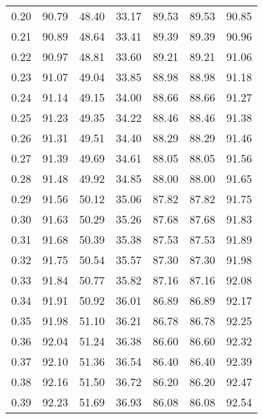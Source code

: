 \begin{tabular}{|c|c|c|c|c|c|c|}
      0.20 &     90.79 &     48.40 &      33.17 &   89.53 &      89.53 &         90.85 \\
      0.21 &     90.89 &     48.64 &      33.41 &   89.39 &      89.39 &         90.96 \\
      0.22 &     90.97 &     48.81 &      33.60 &   89.21 &      89.21 &         91.06 \\
      0.23 &     91.07 &     49.04 &      33.85 &   88.98 &      88.98 &         91.18 \\
      0.24 &     91.14 &     49.15 &      34.00 &   88.66 &      88.66 &         91.27 \\
      0.25 &     91.23 &     49.35 &      34.22 &   88.46 &      88.46 &         91.38 \\
      0.26 &     91.31 &     49.51 &      34.40 &   88.29 &      88.29 &         91.46 \\
      0.27 &     91.39 &     49.69 &      34.61 &   88.05 &      88.05 &         91.56 \\
      0.28 &     91.48 &     49.92 &      34.85 &   88.00 &      88.00 &         91.65 \\
      0.29 &     91.56 &     50.12 &      35.06 &   87.82 &      87.82 &         91.75 \\
      0.30 &     91.63 &     50.29 &      35.26 &   87.68 &      87.68 &         91.83 \\
      0.31 &     91.68 &     50.39 &      35.38 &   87.53 &      87.53 &         91.89 \\
      0.32 &     91.75 &     50.54 &      35.57 &   87.30 &      87.30 &         91.98 \\
      0.33 &     91.84 &     50.77 &      35.82 &   87.16 &      87.16 &         92.08 \\
      0.34 &     91.91 &     50.92 &      36.01 &   86.89 &      86.89 &         92.17 \\
      0.35 &     91.98 &     51.10 &      36.21 &   86.78 &      86.78 &         92.25 \\
      0.36 &     92.04 &     51.24 &      36.38 &   86.60 &      86.60 &         92.32 \\
      0.37 &     92.10 &     51.36 &      36.54 &   86.40 &      86.40 &         92.39 \\
      0.38 &     92.16 &     51.50 &      36.72 &   86.20 &      86.20 &         92.47 \\
      0.39 &     92.23 &     51.69 &      36.93 &   86.08 &      86.08 &         92.54 \\

\end{tabular}
